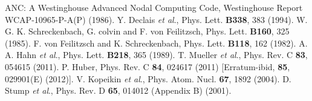 \documentclass[aps,prl,twocolumn,superscriptaddress,showpacs]{revtex4-1}
\begin{document}
\begin{thebibliography}{}
 ANC: A Westinghouse Advanced Nodal Computing Code, Westinghouse Report WCAP-10965-P-A(P) (1986).
 Y. Declais {\it et al}., Phys. Lett. {\bf B338}, 383 (1994).
 W. G. K. Schreckenbach, G. colvin and F. von Feilitzsch,  Phys. Lett. {\bf B160}, 325 (1985).
 F. von Feilitzsch and K. Schreckenbach, Phys. Lett. {\bf B118}, 162 (1982).
 A. A. Hahn {\it et al}., Phys. Lett. {\bf B218}, 365 (1989).
 T. Mueller {\it et al}., Phys. Rev. C {\bf 83}, 054615 (2011).
 P. Huber, Phys. Rev. C {\bf 84}, 024617 (2011) [Erratum-ibid, {\bf 85}, 029901(E) (2012)].
 V. Kopeikin {\it et al}., Phys. Atom. Nucl. {\bf 67}, 1892 (2004).
 D. Stump {\it et al}., Phys. Rev. D {\bf 65}, 014012 (Appendix B) (2001).


\end{thebibliography}
\end{document}
